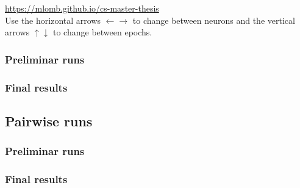 \url{https://mlomb.github.io/cs-master-thesis} \\

Use the horizontal arrows $\leftarrow \rightarrow$ to change between neurons and the vertical arrows $\uparrow \downarrow$ to change between epochs.

\subsubsection{Preliminar runs}


\subsubsection{Final results}



\newpage
\subsection{Pairwise runs}
\label{appendix:pairwise}

\subsubsection{Preliminar runs}


\subsubsection{Final results}



